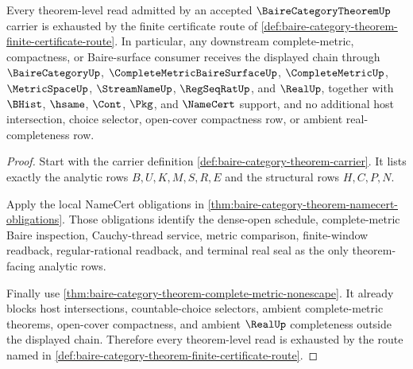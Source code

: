 \begin{theorem}
\label{thm:baire-category-theorem-route-nonescape}
Every theorem-level read admitted by an accepted $\BaireCategoryTheoremUp$ carrier is exhausted by the finite certificate route of \autoref{def:baire-category-theorem-finite-certificate-route}. In particular, any downstream complete-metric, compactness, or Baire-surface consumer receives the displayed chain through $\BaireCategoryUp$, $\CompleteMetricBaireSurfaceUp$, $\CompleteMetricUp$, $\MetricSpaceUp$, $\StreamNameUp$, $\RegSeqRatUp$, and $\RealUp$, together with $\BHist$, $\hsame$, $\Cont$, $\Pkg$, and $\NameCert$ support, and no additional host intersection, choice selector, open-cover compactness row, or ambient real-completeness row.
\end{theorem}
\begin{proof}
Start with the carrier definition \autoref{def:baire-category-theorem-carrier}. It lists exactly the analytic rows $B,U,K,M,S,R,E$ and the structural rows $H,C,P,N$.

Apply the local NameCert obligations in \autoref{thm:baire-category-theorem-namecert-obligations}. Those obligations identify the dense-open schedule, complete-metric Baire inspection, Cauchy-thread service, metric comparison, finite-window readback, regular-rational readback, and terminal real seal as the only theorem-facing analytic rows.

Finally use \autoref{thm:baire-category-theorem-complete-metric-nonescape}. It already blocks host intersections, countable-choice selectors, ambient complete-metric theorems, open-cover compactness, and ambient $\RealUp$ completeness outside the displayed chain. Therefore every theorem-level read is exhausted by the route named in \autoref{def:baire-category-theorem-finite-certificate-route}.
\end{proof}


